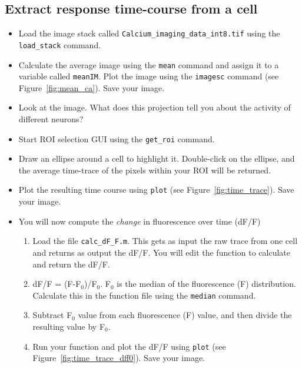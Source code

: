 \documentclass[paper=a4, fontsize=11pt]{scrartcl} %
\numberwithin{equation}{section} %
\numberwithin{figure}{section} %
\numberwithin{table}{section} %
\newcommand{\sub}[1]{\ensuremath{_{#1}}}
\begin{document}
\subsection{Extract response time-course from a cell}
\begin{itemize}
\setlength{\parskip}{0.25em}
\item Load the image stack called \texttt{Calcium\_imaging\_data\_int8.tif} using the \texttt{load\_stack} command.
\item Calculate the average image using the \texttt{mean} command and assign it to a variable called \texttt{meanIM}.  Plot the image using the \texttt{imagesc} command (see Figure~\ref{fig:mean_ca}). Save your image.
\item Look at the image. What does this projection tell you about the activity of different neurons?
\item Start ROI selection GUI using the \texttt{get\_roi} command.
\item Draw an ellipse around a cell to highlight it. Double-click on the ellipse, and the average time-trace of the pixels within your ROI will be returned.
\item Plot the resulting time course using \texttt{plot} (see Figure~\ref{fig:time_trace}). Save your image.
\item You will now compute the \textit{change} in fluorescence over time (dF/F)
	\begin{enumerate}
	\item Load the file \texttt{calc\_dF\_F.m}. This gets as input the raw trace from one cell and returns as output the dF/F. You will edit	the function to calculate and return the dF/F.
	\item dF/F = (F-F\sub{0})/F\sub{0}. F\sub{0} is the median of the fluorescence (F) distribution. Calculate this in the function file using the \texttt{median} command.
	\item Subtract F\sub{0} value from each fluorescence (F) value, and then divide the resulting value by F\sub{0}.
	\item Run your function and plot the dF/F using \texttt{plot} (see Figure~\ref{fig:time_trace_dff0}). Save your image.
	\end{enumerate}
\end{itemize}
\end{document}

